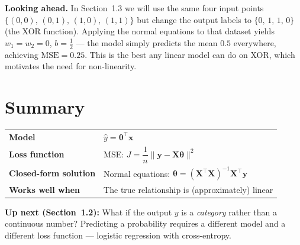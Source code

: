 \documentclass[12pt, a4paper]{article}
\theoremstyle{definition}
\newcommand{\bth}{\boldsymbol{\theta}}
\newcommand{\bx}{\mathbf{x}}
\newcommand{\bX}{\mathbf{X}}
\newcommand{\by}{\mathbf{y}}
\newcommand{\yhat}{\hat{y}}
\begin{document}
\begin{notebox}
\textbf{Looking ahead.}
In Section~1.3 we will use the same four input points
$\{(0,0),\,(0,1),\,(1,0),\,(1,1)\}$ but change the output labels to
$\{0,\,1,\,1,\,0\}$ (the XOR function). Applying the normal equations to
that dataset yields $w_1 = w_2 = 0$, $b = \tfrac{1}{2}$ — the model simply
predicts the mean $0.5$ everywhere, achieving $\mathrm{MSE} = 0.25$.
This is the best any linear model can do on XOR, which motivates the
need for non-linearity.
\end{notebox}

\section{Summary}

\begin{center}
\renewcommand{\arraystretch}{1.5}
\begin{tabular}{ll}
\toprule
\textbf{Model}             & $\yhat = \bth^{\top}\bx$ \\
\textbf{Loss function}     & MSE: $J = \dfrac{1}{n}\|\by - \bX\bth\|^2$ \\
\textbf{Closed-form solution} & Normal equations: $\bth = (\bX^{\top}\bX)^{-1}\bX^{\top}\by$ \\
\textbf{Works well when}   & The true relationship is (approximately) linear \\
\bottomrule
\end{tabular}
\end{center}

\bigskip
\textbf{Up next (Section~1.2):} What if the output $y$ is a \emph{category}
rather than a continuous number? Predicting a probability requires a
different model and a different loss function — logistic regression with
cross-entropy.
\end{document}
